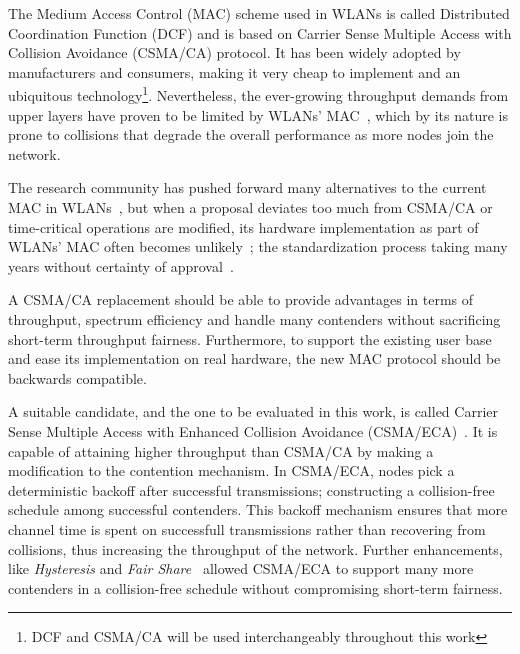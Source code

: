 \documentclass[a4paper,journal]{IEEEtran}
\begin{document}
The Medium Access Control (MAC) scheme used in WLANs is called Distributed Coordination Function (DCF) and is based on Carrier Sense Multiple Access with Collision Avoidance (CSMA/CA) protocol. It has been widely adopted by manufacturers and consumers, making it very cheap to implement and an ubiquitous technology\footnote{DCF and CSMA/CA will be used interchangeably throughout this work}. Nevertheless, the ever-growing throughput demands from upper layers have proven to be limited by WLANs' MAC~\cite{perahia2008ieee}, which by its nature is prone to collisions that degrade the overall performance as more nodes join the network.

The research community has pushed forward many alternatives to the current MAC in WLANs~\cite{bharghavan1994map,wang2004ncr,cali2000dti,lopez-toledo2006aoi,
barcelo2008lba,bellalta2009vtc,HE,CSMA_ECA,L_MAC2,hui2011epp,barcelo2011tcf}, but when a proposal deviates too much from CSMA/CA or time-critical operations are modified, its hardware implementation as part of WLANs' MAC often becomes unlikely~\cite{WMP}; the standardization process taking many years without certainty of approval~\cite{perahia2008ieee}. 


A CSMA/CA replacement should be able to provide advantages in terms of throughput, spectrum efficiency and handle many contenders without sacrificing short-term throughput fairness. Furthermore, to support the existing user base and ease its implementation on real hardware, the new MAC protocol should be backwards compatible.


A suitable candidate, and the one to be evaluated in this work, is called Carrier Sense Multiple Access with Enhanced Collision Avoidance (CSMA/ECA)~\cite{barcelo2008lba}. It is capable of attaining higher throughput than CSMA/CA by making a modification to the contention mechanism. In CSMA/ECA, nodes pick a deterministic backoff after successful transmissions; constructing a collision-free schedule among successful contenders. This backoff mechanism ensures that more channel time is spent on successfull transmissions rather than recovering from collisions, thus increasing the throughput of the network. Further enhancements, like \emph{Hysteresis} and \emph{Fair Share}~\cite{research2standards} allowed CSMA/ECA to support many more contenders in a collision-free schedule without compromising short-term fairness.
\end{document}
